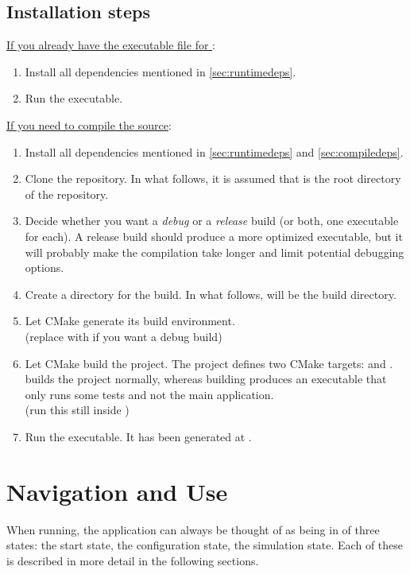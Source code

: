 \documentclass[11pt,a4paper,twoside,openright]{report}
\begin{document}
\subsection{Installation steps}
\underline{If you already have the executable file for \pname{}}:
\begin{enumerate}
	\item
		Install all dependencies mentioned in \ref{sec:runtimedeps}.
	\item
		Run the executable.
\end{enumerate}
\underline{If you need to compile the source}:
\begin{enumerate}
	\item
		Install all dependencies mentioned in \ref{sec:runtimedeps} and \ref{sec:compiledeps}.
	\item
		Clone the repository. In what follows, it is assumed that  is the root directory of the repository.
	\item
		Decide whether you want a \emph{debug} or a \emph{release} build (or both, one executable for each). A release build should produce a more optimized executable, but it will probably make the compilation take longer and limit potential debugging options.
	\item
		Create a directory for the build. In what follows,  will be the build directory.
	\item
		Let CMake generate its build environment.
		\\
		(replace  with  if you want a debug build)
	\item
		Let CMake build the project. The project defines two CMake targets:  and .  builds the project normally, whereas building  produces an executable that only runs some tests and not the main application.
		\\
		(run this still inside )
	\item
		Run the executable. It has been generated at .
\end{enumerate}

\section{Navigation and Use}
When running, the application can always be thought of as being in of three states: the start state, the configuration state, the simulation state. Each of these is described in more detail in the following sections.
\end{document}
